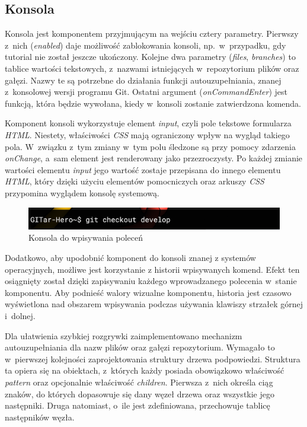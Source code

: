 \documentclass[12pt,a4paper,polish,thesis]{dcsbook}
\begin{document}
{	\subsection{Konsola}

	Konsola jest komponentem przyjmującym na wejściu cztery parametry. Pierwszy z~nich (\textit{enabled}) daje możliwość zablokowania konsoli, np.~w~przypadku, gdy tutorial nie został jeszcze ukończony. Kolejne dwa parametry (\textit{files}, \textit{branches}) to tablice wartości tekstowych, z~nazwami istniejących w~repozytorium plików oraz gałęzi. Nazwy te są potrzebne do działania funkcji autouzupełniania, znanej z~konsolowej wersji programu Git. Ostatni argument (\textit{onCommandEnter}) jest funkcją, która będzie wywołana, kiedy w~konsoli zostanie zatwierdzona komenda.

	Komponent konsoli wykorzystuje element \textit{input}, czyli pole tekstowe formularza \textit{HTML}. Niestety, właściwości \textit{CSS} mają ograniczony wpływ na wygląd takiego pola. W~związku z~tym zmiany w~tym polu śledzone są przy pomocy zdarzenia \textit{onChange}, a~sam element jest renderowany jako przezroczysty. Po każdej zmianie wartości elementu \textit{input} jego wartość zostaje przepisana do innego elementu \textit{HTML}, który dzięki użyciu elementów pomocniczych oraz arkuszy \textit{CSS} przypomina wyglądem konsolę systemową.

	\begin{figure}[h]
		\centering
		\includegraphics[width=15cm]{component-console}
		\caption{Konsola do wpisywania poleceń}
		\label{fig:console}
	\end{figure}

	Dodatkowo, aby upodobnić komponent do konsoli znanej z systemów operacyjnych, możliwe jest korzystanie z historii wpisywanych komend. Efekt ten osiągnięty został dzięki zapisywaniu każdego wprowadzanego polecenia w~stanie komponentu. Aby podnieść walory wizualne komponentu, historia jest czasowo wyświetlona nad obszarem wpisywania podczas używania klawiszy strzałek górnej i~dolnej.

	Dla ułatwienia szybkiej rozgrywki zaimplementowano mechanizm autouzupełniania dla nazw plików oraz gałęzi repozytorium. Wymagało to w~pierwszej kolejności zaprojektowania struktury drzewa podpowiedzi. Struktura ta opiera się na obiektach, z~których każdy posiada obowiązkowo właściwość \textit{pattern} oraz opcjonalnie właściwość \textit{children}. Pierwsza z~nich określa ciąg znaków, do których dopasowuje się dany węzeł drzewa oraz wszystkie jego następniki. Druga natomiast, o~ile jest zdefiniowana, przechowuje tablicę następników węzła.

}
\end{document}
